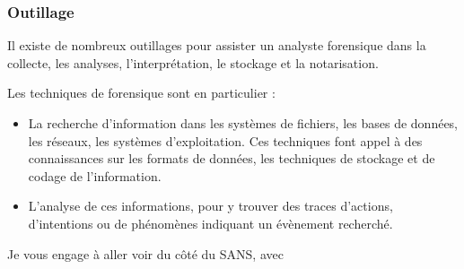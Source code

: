 \subsubsection{Outillage}

Il existe de nombreux outillages pour assister un analyste forensique dans la collecte, les analyses, l'interprétation, le stockage et la notarisation.

Les techniques de forensique sont en particulier  :

\begin{itemize}
  \item La recherche d'information dans les systèmes de fichiers, les bases de données, les réseaux, les systèmes d'exploitation. Ces techniques font appel à des connaissances sur les formats de données, les techniques de stockage et de codage de l'information. 
  \item L'analyse de ces informations, pour y trouver des traces d'actions, d'intentions ou de phénomènes indiquant un évènement recherché. 
\end{itemize}

Je  vous engage à aller voir du côté du SANS, avec 




